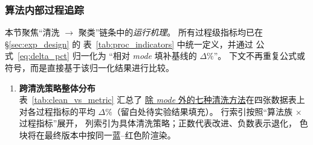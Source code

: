 \documentclass[10pt]{article} %
\numberwithin{equation}{section}
\begin{document}
\subsubsection{算法内部过程追踪}
\label{subsec:internal_tracking}

本节聚焦“清洗 $\rightarrow$ 聚类”链条中的\emph{运行机理}。
所有过程级指标均已在 §\ref{sec:exp_design} 的
表~\ref{tab:proc_indicators} 中统一定义，并通过
公式~\eqref{eq:delta_pct} 归一化为
“相对 \textit{mode} 填补基线的 $\Delta\%$”。
下文不再重复公式或符号，而是直接基于该归一化结果进行比较。

\begin{enumerate}[label=(\alph*)]
\item \textbf{跨清洗策略整体分布}\\
表~\ref{tab:clean_vs_metric} 汇总了
\underline{除 \textit{mode} 外的七种清洗方法}在四张数据表上
对各过程指标的平均 $\Delta\%$（留白处待实验结果填充）。
行索引按照“算法族 $\times$ 过程指标”展开，
列索引为具体清洗策略；正数代表改进、负数表示退化，
色块将在最终版本中按同一蓝–红色阶渲染。


\end{enumerate}
\end{document}
